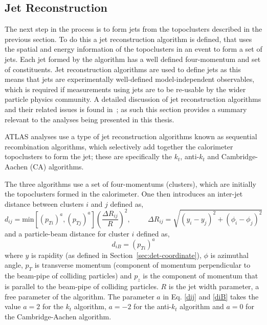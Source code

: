 \FloatBarrier
\newpage
\subsection{Jet Reconstruction}
\label{sec:obj-jets_reco}

The next step in the process is to form jets from the topoclusters described in the previous section.
To do this a jet reconstruction algorithm is defined, that uses the spatial and energy information of the topoclusters in an event
to form a set of jets.
Each jet formed by the algorithm has a well defined four-momentum and set of constituents.
Jet reconstruction algorithms are used to define jets as this means that jets are experimentally well-defined model-independent observables,
which is required if measurements using jets are to be re-usable by the wider particle physics community.
A detailed discussion of jet reconstruction algorithms
and their related issues is found in~\cite{obj-jets_reco_salam};
as such this section provides a summary relevant to the analyses being presented in this thesis.

ATLAS analyses use a type of jet reconstruction algorithms known as sequential recombination algorithms,
which selectively add together the calorimeter topoclusters to form the jet;
these are specifically the $k_t$, anti-$k_t$ and Cambridge-Aachen (CA) algorithms.

The three algorithms use a set of four-momentums (clusters), which are initially the topoclusters formed in the calorimeter.
One then introduces an inter-jet distance between clusters $i$ and $j$ defined as,
\begin{equation}
  d_{ij} = \text{min}
  [(p_{ Ti})^a, (p_{ Tj})^a]  \left(\frac{\Delta  R_{ij}}{R}\right) ^2, \hspace{1cm} \Delta R_{ij} = \sqrt{(y_{i} - y_{j})^2 + (\phi_{i} - \phi_{j})^2} \label{dij}
\end{equation}
\noindent and a particle-beam distance for cluster $i$ defined as,
\begin{equation}
  d_{iB} = (p_{Ti})^a \label{diB}
\end{equation}
where $y$  is rapidity (as defined in Section~\ref{sec:det-coordinate}), $\phi$ is azimuthal angle,
$p_T$ is transverse momentum (component of momentum perpendicular to the beam-pipe of colliding particles)
and $p_z$ is the component of momentum that is parallel to the beam-pipe of colliding particles.
$R$ is the jet width parameter, a free parameter of the algorithm.
The parameter $a$ in Eq. \eqref{dij} and \eqref{diB} takes the value $a = 2$ for the $k_t$ algorithm, $a = -2$ for the anti-$k_t$ algorithm 
and  $a = 0$ for the Cambridge-Aachen algorithm.


